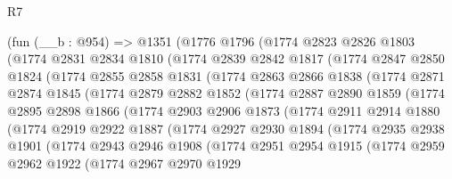 \begin{lexlean}{R7}
\begin{coremodule}
    (fun (__b : @954) =>
    @1351
      (@1776
        @1796
        (@1774
          @2823
          @2826
          @1803
          (@1774
            @2831
            @2834
            @1810
            (@1774
              @2839
              @2842
              @1817
              (@1774
                @2847
                @2850
                @1824
                (@1774
                  @2855
                  @2858
                  @1831
                  (@1774
                    @2863
                    @2866
                    @1838
                    (@1774
                      @2871
                      @2874
                      @1845
                      (@1774
                        @2879
                        @2882
                        @1852
                        (@1774
                          @2887
                          @2890
                          @1859
                          (@1774
                            @2895
                            @2898
                            @1866
                            (@1774
                              @2903
                              @2906
                              @1873
                              (@1774
                                @2911
                                @2914
                                @1880
                                (@1774
                                  @2919
                                  @2922
                                  @1887
                                  (@1774
                                    @2927
                                    @2930
                                    @1894
                                    (@1774
                                      @2935
                                      @2938
                                      @1901
                                      (@1774
                                        @2943
                                        @2946
                                        @1908
                                        (@1774
                                          @2951
                                          @2954
                                          @1915
                                          (@1774
                                            @2959
                                            @2962
                                            @1922
                                            (@1774
                                              @2967
                                              @2970
                                              @1929

\end{coremodule}
\end{lexlean}

